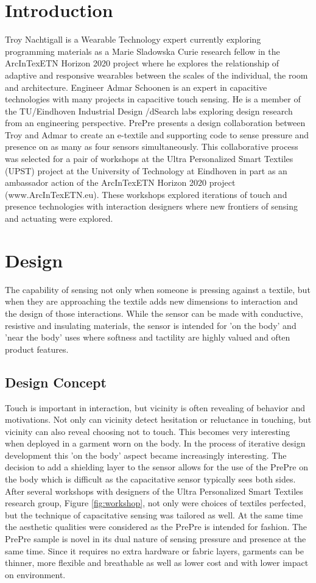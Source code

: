 \documentclass{sigchi-ext}
\begin{document}
\section{Introduction}
Troy Nachtigall is a Wearable Technology expert currently exploring programming materials as a Marie Sladowska Curie research fellow in the ArcInTexETN Horizon 2020 project where he explores the relationship of adaptive and responsive wearables between the scales of the individual, the room and architecture. Engineer Admar Schoonen is an expert in capacitive technologies with many projects in capacitive touch sensing.  He is a member of the TU/Eindhoven Industrial Design /dSearch labs exploring design research from an engineering perspective.  PrePre presents a design collaboration between Troy and Admar to create an e-textile and supporting code to sense pressure and  presence on as many as four sensors simultaneously.  This collaborative process was selected for a pair of workshops at the Ultra Personalized Smart Textiles (UPST) project at the University of Technology at Eindhoven in part as an ambassador action of the ArcInTexETN Horizon 2020 project (www.ArcInTexETN.eu). These workshops explored iterations of touch and presence technologies with interaction designers where new frontiers of sensing and actuating were explored.  
\section{Design}
The capability of sensing not only when someone is pressing against a textile, but when they are approaching the textile adds new dimensions to interaction and the design of those interactions.  While the sensor can be made with conductive, resistive and insulating materials, the sensor is intended for 'on the body' and 'near the body' uses where softness and tactility are highly valued and often product features. 
\subsection{Design Concept}
Touch is important in interaction, but vicinity is often revealing of behavior and motivations.  Not only can vicinity detect hesitation or reluctance in touching, but vicinity can also reveal choosing not to touch. This becomes very interesting when deployed in a garment worn on the body. In the process of iterative design development this 'on the body' aspect became increasingly interesting. The decision to add a shielding layer to the sensor allows for the use of the PrePre on the body which is difficult as the capacitative sensor typically sees both sides. After several workshops with designers of the Ultra Personalized Smart Textiles research group, Figure \ref{fig:workshop}, not only were choices of textiles perfected, but the technique of capacitative sensing was tailored as well. At the same time the aesthetic qualities were considered as the PrePre is intended for fashion. The PrePre sample is novel in its dual nature of sensing pressure and presence at the same time. Since it requires no extra hardware or fabric layers, garments can be thinner, more flexible and breathable as well as lower cost and with lower impact on environment.
\end{document}
